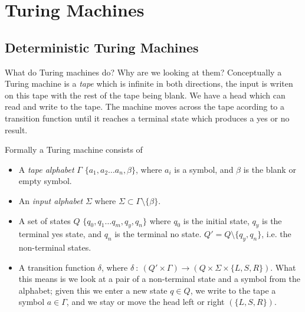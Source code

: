 \section{Turing Machines}
\subsection{Deterministic Turing Machines}
What do Turing machines do? Why are we looking at them?
Conceptually a Turing machine is a \textit{tape} which is infinite in both directions,
the input is writen on this tape with the rest of the tape being blank. We have a head
which can read and write to the tape. The machine moves across the tape acording to
a transition function until it reaches a terminal state which produces a yes or no result.

\begin{center}
\end{center}

\begin{definition}
    Formally a Turing machine consists of
    \begin{itemize}
        \item A \textit{tape alphabet} $\Gamma$ $\{a_1, a_2 \dots a_n, \beta\}$,
            where $a_i$ is a symbol, and $\beta$ is the blank or empty symbol.
        \item An \textit{input alphabet} $\Sigma$
            where $\Sigma \subset \Gamma \setminus \{\beta\}$.
        \item A set of states $Q$ $\{q_0, q_1 \dots q_m, q_y, q_n\}$ where $q_0$ is the
            initial state, $q_y$ is the terminal yes state, and $q_n$ is the terminal no state.
            $Q\prime = Q \setminus \{q_y,q_n\}$, i.e. the non-terminal states.
        \item A transition function $\delta$,
            where $\delta\ :\ (Q\prime \times \Gamma) \rightarrow
            (Q \times \Sigma \times \{L,S,R\})$.
            What this means is we look at a pair of a non-terminal state
            and a symbol from the alphabet;
            given this we enter a new state $q \in Q$,
            we write to the tape a symbol $a \in \Gamma$,
            and we stay or move the head left or right $(\{L,S,R\})$.
    \end{itemize}
\end{definition}

